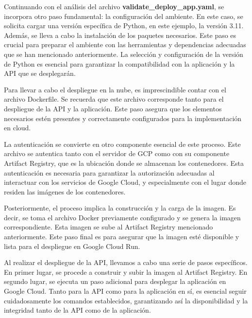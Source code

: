\newpage

Continuando con el análisis del archivo \textbf{validate\_deploy\_app.yaml}, se incorpora otro paso fundamental: la configuración del ambiente. En este caso, se solicita cargar una versión específica de Python, en este ejemplo, la versión 3.11. Además, se lleva a cabo la instalación de los paquetes necesarios. Este paso es crucial para preparar el ambiente con las herramientas y dependencias adecuadas que se han mencionado anteriormente. La selección y configuración de la versión de Python es esencial para garantizar la compatibilidad con la aplicación y la API que se desplegarán. \newline

Para llevar a cabo el despliegue en la nube, es imprescindible contar con el archivo Dockerfile. Se recuerda que este archivo corresponde tanto para el despliegue de la API y la aplicación. Este paso asegura que los elementos necesarios estén presentes y correctamente configurados para la implementación en cloud. \newline

La autenticación se convierte en otro componente esencial de este proceso. Este archivo se autentica tanto con el servidor de GCP como con su componente Artifact Registry, que es la ubicación donde se almacenan los contenedores. Esta autenticación es necesaria para garantizar la autorización adecuadas al interactuar con los servicios de Google Cloud, y especialmente con el lugar donde residen las imágenes de los contenedores. \newline

Posteriormente, el proceso implica la construcción y la carga de la imagen. Es decir, se toma el archivo Docker previamente configurado y se genera la imagen correspondiente. Esta imagen se sube al Artifact Registry mencionado anteriormente. Este paso final es para asegurar que la imagen esté disponible y lista para el despliegue en Google Cloud Run.

\newpage

Al realizar el despliegue de la API, llevamos a cabo una serie de pasos específicos. En primer lugar, se procede a construir y subir la imagen al Artifact Registry. En segundo lugar, se ejecuta un paso adicional para desplegar la aplicación en Google Cloud. Tanto para la API como para la aplicación en sí, es esencial seguir cuidadosamente los comandos establecidos, garantizando así la disponibilidad y la integridad tanto de la API como de la aplicación. \newline

